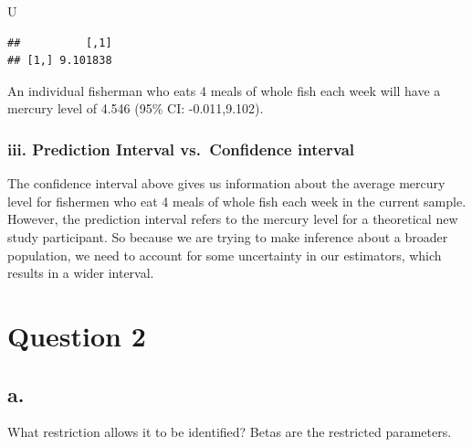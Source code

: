 \documentclass[]{article}
\newenvironment{Shaded}{\begin{snugshade}}{\end{snugshade}}
\newcommand{\CommentTok}[1]{\textcolor[rgb]{0.56,0.35,0.01}{\textit{#1}}}
\newcommand{\DataTypeTok}[1]{\textcolor[rgb]{0.13,0.29,0.53}{#1}}
\newcommand{\DecValTok}[1]{\textcolor[rgb]{0.00,0.00,0.81}{#1}}
\newcommand{\FloatTok}[1]{\textcolor[rgb]{0.00,0.00,0.81}{#1}}
\newcommand{\KeywordTok}[1]{\textcolor[rgb]{0.13,0.29,0.53}{\textbf{#1}}}
\newcommand{\NormalTok}[1]{#1}
\newcommand{\OperatorTok}[1]{\textcolor[rgb]{0.81,0.36,0.00}{\textbf{#1}}}
\newcommand{\StringTok}[1]{\textcolor[rgb]{0.31,0.60,0.02}{#1}}
\begin{document}
\begin{Shaded}
\begin{Highlighting}[]
\NormalTok{U}
\end{Highlighting}
\end{Shaded}

\begin{verbatim}
##          [,1]
## [1,] 9.101838
\end{verbatim}

An individual fisherman who eats 4 meals of whole fish each week will
have a mercury level of 4.546 (95\% CI: -0.011,9.102).

\hypertarget{iii.-prediction-interval-vs.confidence-interval}{%
\subsubsection{iii. Prediction Interval vs.~Confidence
interval}\label{iii.-prediction-interval-vs.confidence-interval}}

The confidence interval above gives us information about the average
mercury level for fishermen who eat 4 meals of whole fish each week in
the current sample. However, the prediction interval refers to the
mercury level for a theoretical new study participant. So because we are
trying to make inference about a broader population, we need to account
for some uncertainty in our estimators, which results in a wider
interval.

\hypertarget{question-2}{%
\section{Question 2}\label{question-2}}

\hypertarget{a.}{%
\subsection{a.}\label{a.}}

What restriction allows it to be identified? Betas are the restricted
parameters.

\begin{Shaded}
\end{Shaded}
\end{document}
